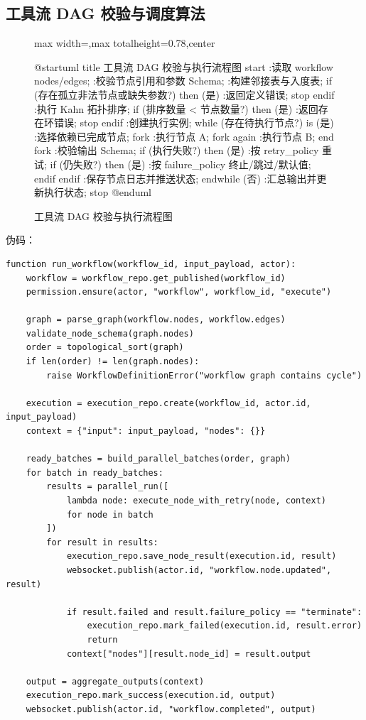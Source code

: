 \documentclass[a4paper,zihao=-4]{ctexart}
\begin{document}
\hypertarget{ux5de5ux5177ux6d41-dag-ux6821ux9a8cux4e0eux8c03ux5ea6ux7b97ux6cd5}{%
\subsection{工具流 DAG
校验与调度算法}\label{ux5de5ux5177ux6d41-dag-ux6821ux9a8cux4e0eux8c03ux5ea6ux7b97ux6cd5}}

\begin{figure}[H]
\centering
\begin{adjustbox}{max width=\linewidth,max totalheight=0.78\textheight,center}
\begingroup
\renewcommand{\PlantUMLJobname}{plantuml-diagrams/req-uml-09}
\begin{plantuml}
@startuml
title 工具流 DAG 校验与执行流程图
start
:读取 workflow nodes/edges;
:校验节点引用和参数 Schema;
:构建邻接表与入度表;
if (存在孤立非法节点或缺失参数?) then (是)
  :返回定义错误;
  stop
endif
:执行 Kahn 拓扑排序;
if (排序数量 < 节点数量?) then (是)
  :返回存在环错误;
  stop
endif
:创建执行实例;
while (存在待执行节点?) is (是)
  :选择依赖已完成节点;
  fork
    :执行节点 A;
  fork again
    :执行节点 B;
  end fork
  :校验输出 Schema;
  if (执行失败?) then (是)
    :按 retry_policy 重试;
    if (仍失败?) then (是)
      :按 failure_policy 终止/跳过/默认值;
    endif
  endif
  :保存节点日志并推送状态;
endwhile (否)
:汇总输出并更新执行状态;
stop
@enduml
\end{plantuml}
\endgroup
\end{adjustbox}
\caption{工具流 DAG 校验与执行流程图}
\end{figure}

伪码：

\begin{lstlisting}
function run_workflow(workflow_id, input_payload, actor):
    workflow = workflow_repo.get_published(workflow_id)
    permission.ensure(actor, "workflow", workflow_id, "execute")

    graph = parse_graph(workflow.nodes, workflow.edges)
    validate_node_schema(graph.nodes)
    order = topological_sort(graph)
    if len(order) != len(graph.nodes):
        raise WorkflowDefinitionError("workflow graph contains cycle")

    execution = execution_repo.create(workflow_id, actor.id, input_payload)
    context = {"input": input_payload, "nodes": {}}

    ready_batches = build_parallel_batches(order, graph)
    for batch in ready_batches:
        results = parallel_run([
            lambda node: execute_node_with_retry(node, context)
            for node in batch
        ])
        for result in results:
            execution_repo.save_node_result(execution.id, result)
            websocket.publish(actor.id, "workflow.node.updated", result)

            if result.failed and result.failure_policy == "terminate":
                execution_repo.mark_failed(execution.id, result.error)
                return
            context["nodes"][result.node_id] = result.output

    output = aggregate_outputs(context)
    execution_repo.mark_success(execution.id, output)
    websocket.publish(actor.id, "workflow.completed", output)
\end{lstlisting}
\end{document}

